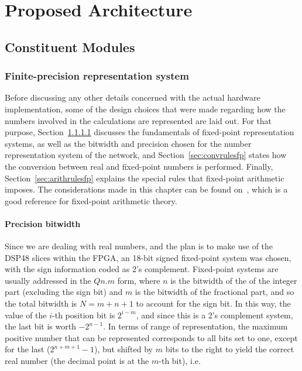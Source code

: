 \chapter{Proposed Architecture}\label{chap:propSol}

\section{Constituent Modules}

\subsection{Finite-precision representation system}
Before discussing any other details concerned with the actual hardware implementation, some of the design choices that were
made regarding how the numbers involved in the calculations are represented are laid out. For that purpose, Section~\ref{sec:precbit} discusses the fundamentals of fixed-point
representation systems, as well as the bitwidth and precision chosen for the number representation system of the network, and Section~\ref{sec:convrulesfp} states
how the conversion between real and fixed-point numbers is performed. Finally, Section~\ref{sec:arithrulesfp} explains the special rules that fixed-point arithmetic
imposes. The considerations made in this chapter can be found on~\cite{Yates13}, which is a good reference for fixed-point arithmetic theory.

\subsubsection{Precision bitwidth}\label{sec:precbit}
Since we are dealing with real numbers, and the plan is to make use of the DSP48 slices within the FPGA, an 18-bit signed fixed-point system was chosen, with the sign
information coded as 2's complement. Fixed-point systems are usually addressed in the $Qn.m$ form, where $n$ is the bitwidth of the of the integer part (excluding
the sign bit) and $m$ is the bitwidth of the fractional part, and so the total bitwidth is $N=m+n+1$ to account for the sign bit. In this way, the value of
the $i$-th position bit is $2^{i-m}$, and since this is a 2's complement system, the last bit is worth $-2^{n-1}$. In terms of range of representation, the maximum positive
number that can be represented corresponds to all bits set to one, except for the last ($2^{n+m+1}-1$), but shifted by $m$ bits to the right to yield the correct real
number (the decimal point is at the $m$-th bit), i.e.


